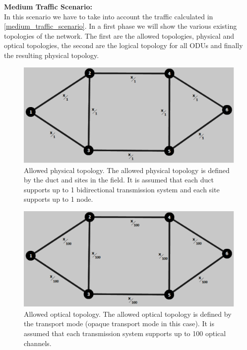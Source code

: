 \newpage
\noindent
\textbf{Medium Traffic Scenario:}\\

In this scenario we have to take into account the traffic calculated in \ref{medium_traffic_scenario}. In a first phase we will show the various existing topologies of the network. The first are the allowed topologies, physical and optical topologies, the second are the logical topology for all ODUs and finally the resulting physical topology.\\

\begin{figure}[H]
\centering
\includegraphics[width=13cm]{sdf/heuristic/opaque/figures/allowed_physical}
\caption{Allowed physical topology. The allowed physical topology is defined by the duct and sites in the field. It is assumed that each duct supports up to 1 bidirectional transmission system and each site supports up to 1 node.}
\label{allowed_physical_surv_ref_medium_heuristic}
\end{figure}

\begin{figure}[H]
\centering
\includegraphics[width=13cm]{sdf/heuristic/opaque/figures/allowed_optical}
\caption{Allowed optical topology. The allowed optical topology is defined by the transport mode (opaque transport mode in this case). It is assumed that each transmission system supports up to 100 optical channels.}
\label{allowed_optical_surv_ref_medium_heuristic}
\end{figure}


